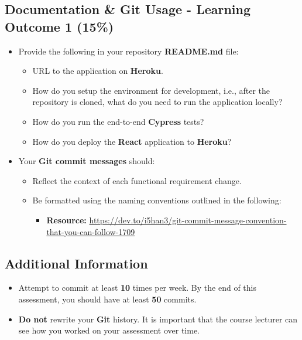 \documentclass{article}
\begin{document}
\subsection*{Documentation \& Git Usage - Learning Outcome 1 (15\%)}
\begin{itemize}
	\item Provide the following in your repository \textbf{README.md} file:
	      \begin{itemize}
	      	\item URL to the application on \textbf{Heroku}.
	      	\item How do you setup the environment for development, i.e., after the repository is cloned, what do you need to run the application locally?
	      	\item How do you run the end-to-end \textbf{Cypress} tests?
	      	\item How do you deploy the \textbf{React} application to \textbf{Heroku}?
	      \end{itemize}
\end{itemize}
\begin{itemize}
	\item Your \textbf{Git commit messages} should:
	      \begin{itemize}
	      	\item Reflect the context of each functional requirement change. 
	      	\item Be formatted using the naming conventions outlined in the following:
	      	      \begin{itemize}
	      	      	\item \textbf{Resource:} \small\href{https://dev.to/i5han3/git-commit-message-convention-that-you-can-follow-1709}{https://dev.to/i5han3/git-commit-message-convention-that-you-can-follow-1709}
	      	      \end{itemize} 
	      \end{itemize}
\end{itemize}
          
\subsection*{Additional Information}
\begin{itemize}
	\item Attempt to commit at least \textbf{10} times per week. By the end of this assessment, you should have at least \textbf{50} commits.
	\item \textbf{Do not} rewrite your \textbf{Git} history. It is important that the course lecturer can see how you worked on your assessment over time. 
\end{itemize}
\end{document}
